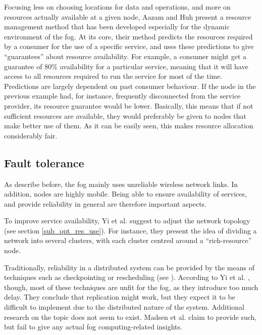 \documentclass{article}
\begin{document}
Focusing less on choosing locations for data and operations, and more on resources actually available at a given node, Aazam and Huh \cite{aazam2015dynamic} present a resource management method that has been developed especially for the dynamic environment of the fog. At its core, their method predicts the resources required by a consumer for the use of a specific service, and uses these predictions to give ``guarantees'' about resource availability. For example, a consumer might get a guarantee of 80\% availability for a particular service, meaning that it will have access to all resources required to run the service for most of the time. Predictions are largely dependent on past consumer behaviour. If the node in the previous example had, for instance, frequently disconnected from the service provider, its resource guarantee would be lower. Basically, this means that if not sufficient resources are available, they would preferably be given to nodes that make better use of them. As it can be easily seen, this makes resource allocation considerably fair.

\subsection{Fault tolerance}
As describe before, the fog mainly uses unreliable wireless network links. In addition, nodes are highly mobile. Being able to ensure availability of services, and provide reliability in general are therefore important aspects.

To improve service availability, Yi et al. \cite{yi2015survey} suggest to adjust the network topology (see section \ref{sub_opt_res_use}). For instance, they present the idea of dividing a network into several clusters, with each cluster centred around a ``rich-resource'' node.

Traditionally, reliability in a distributed system can be provided by the means of techniques such as checkpointing or rescheduling (see \cite{tanebaum2013}). According to Yi et al. \cite{yi2015survey}, though, most of these techniques are unfit for the fog, as they introduce too much delay. They conclude that replication might work, but they expect it to be difficult to implement due to the distributed nature of the system. Additional research on the topic does not seem to exist. Madsen et al. \cite{madsen2013reliability} claim to provide such, but fail to give any actual fog computing-related insights.

\end{document}
